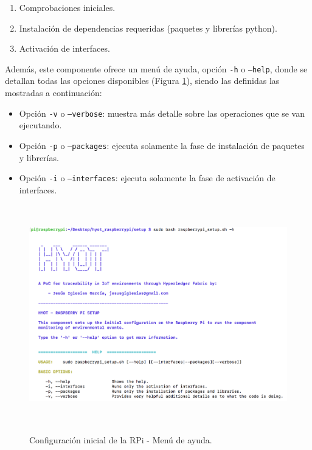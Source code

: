 \documentclass[12pt,a4paper, twoside]{report}
\begin{document}
	\begin{enumerate}
		\item Comprobaciones iniciales.
		\item Instalación de dependencias requeridas (paquetes y librerías \gls{python}).
		\item Activación de interfaces.
	\end{enumerate}
	
	Además, este componente ofrece un menú de ayuda, opción \texttt{-h} o \texttt{--help}, donde se detallan todas las opciones disponibles (Figura \ref{fig:userguide_setup_help}), siendo las definidas las mostradas a continuación:
	
	\begin{itemize}
		\item Opción \texttt{-v} o \texttt{--verbose}: muestra más detalle sobre las operaciones que se van ejecutando.
		\item Opción \texttt{-p} o \texttt{--packages}: ejecuta solamente la fase de instalación de paquetes y librerías.
		\item Opción \texttt{-i} o \texttt{--interfaces}: ejecuta solamente la fase de activación de interfaces.
	\end{itemize}

	\begin{figure}[!ht]   
		\caption{Configuración inicial de la RPi - Menú de ayuda.} 
		\begin{center} 
			\includegraphics[width=15cm,height=9.5cm]{Images/userGuide/setup/help} \\
			\label{fig:userguide_setup_help} 
		\end{center}  
	\end{figure}
\end{document}
